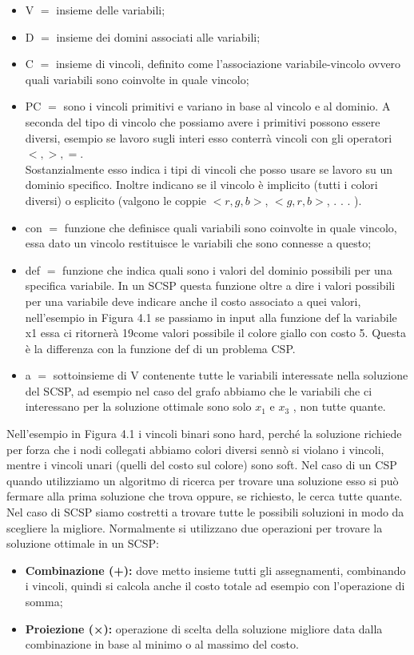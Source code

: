 \begin{itemize}
    \item V $=$ insieme delle variabili;
    \item D $=$ insieme dei domini associati alle variabili;
    \item C $=$ insieme di vincoli, definito come l’associazione variabile-vincolo ovvero quali variabili sono coinvolte in quale vincolo;
    \item PC $=$ sono i vincoli primitivi e variano in base al vincolo e al dominio. A seconda del tipo di vincolo che possiamo avere i primitivi possono essere diversi, esempio se lavoro sugli interi esso conterrà vincoli con gli operatori $<,>,=$.
    \\Sostanzialmente esso indica i tipi di vincoli che posso usare se lavoro su un dominio specifico. Inoltre indicano se il vincolo è implicito (tutti i colori diversi) o esplicito (valgono le coppie $<r,g,b>$, $<g,r,b>$, . . . ).
    \item con $=$ funzione che definisce quali variabili sono coinvolte in quale vincolo, essa dato un vincolo restituisce le variabili che sono connesse a questo;
    \item def $=$ funzione che indica quali sono i valori del dominio possibili per una specifica variabile. In un SCSP questa funzione oltre a dire i valori possibili per una variabile deve indicare anche il costo associato a quei valori, nell’esempio in Figura 4.1 se passiamo in input alla funzione def la variabile x1 essa ci ritornerà 19come valori possibile il colore giallo con costo 5. Questa è la differenza con la funzione def di un problema CSP.
    \item a $=$ sottoinsieme di V contenente tutte le variabili interessate nella soluzione del SCSP, ad esempio nel caso del grafo abbiamo che le variabili che ci interessano per la soluzione ottimale sono solo $x_1$ e $x_3$ , non tutte quante.
\end{itemize}
Nell’esempio in Figura 4.1 i vincoli binari sono hard, perché la soluzione richiede per forza che i nodi collegati abbiamo colori diversi sennò si violano i vincoli, mentre i vincoli unari (quelli del costo sul colore) sono soft. Nel caso di un CSP quando utilizziamo un algoritmo di ricerca per trovare una soluzione esso si può fermare alla prima soluzione che trova oppure, se richiesto, le cerca tutte quante. Nel caso di SCSP siamo costretti a trovare tutte le possibili soluzioni in modo da scegliere la
migliore. Normalmente si utilizzano due operazioni per trovare la soluzione ottimale in un SCSP:
\begin{itemize}
    \item \textbf{Combinazione (+):} dove metto insieme tutti gli assegnamenti, combinando i vincoli, quindi si calcola anche il costo totale ad esempio con l’operazione di somma;
    \item \textbf{Proiezione (×):} operazione di scelta della soluzione migliore data dalla combinazione in base al minimo o al massimo del costo.
\end{itemize}
\newpage

